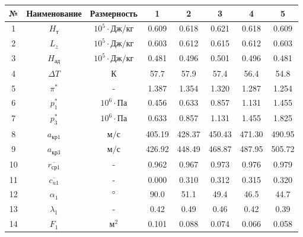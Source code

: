 	\begin{center}
		\begin{longtable}{|c|c|c|c|c|c|c|c|}
			\hline
			\textbf{№} & 
			\textbf{Наименование} & 
			\textbf{Размерность} & 
			\textbf{1} & 
			\textbf{2} &
			\textbf{3} &
			\textbf{4} &
			\textbf{5} \\\hline
			\endhead
			
				1 & $H_т$ & $10^5 \cdot Дж/кг$ & 0.609 & 0.618 & 0.621 & 0.618 & 0.609 \\\hline
			
				2 & $L_z$ & $10^5 \cdot Дж/кг$ & 0.603 & 0.612 & 0.615 & 0.612 & 0.603 \\\hline
			
				3 & $H_{ад}$ & $10^5 \cdot Дж/кг$ & 0.481 & 0.496 & 0.501 & 0.496 & 0.481 \\\hline
			
				4 & $\Delta T$ & $К$ & 57.7 & 57.9 & 57.4 & 56.4 & 54.8 \\\hline
			
				5 & $\pi^*$ & - & 1.387 & 1.354 & 1.320 & 1.287 & 1.254 \\\hline
			
				6 & $p_1^*$ & $10^6 \cdot Па$ & 0.456 & 0.633 & 0.857 & 1.131 & 1.455 \\\hline
			
				7 & $p_3^*$ & $10^6 \cdot Па$ & 0.633 & 0.857 & 1.131 & 1.455 & 1.825 \\\hline
			
				8 & $a_{кр1}$ & $м/с$ & 405.19 & 428.37 & 450.43 & 471.30 & 490.95 \\\hline
			
				9 & $a_{кр3}$ & $м/с$ & 426.92 & 448.49 & 468.87 & 487.95 & 505.72 \\\hline
			
				10 & $\overline{r_{ср1}}$ & - & 0.962 & 0.967 & 0.973 & 0.976 & 0.979 \\\hline
			
				11 & $\overline{c_{u1}}$ & - & 0.000 & 0.310 & 0.312 & 0.315 & 0.320 \\\hline
			
				12 & $\alpha_1$ & $\degree$ & 90.0 & 51.1 & 49.4 & 46.5 & 44.7 \\\hline
			
				13 & $\lambda_1$ & - & 0.42 & 0.49 & 0.46 & 0.42 & 0.39 \\\hline
			
				14 & $F_1$ & $м^2$ & 0.101 & 0.088 & 0.074 & 0.066 & 0.058 \\\hline
			

\end{longtable}
\end{center}
